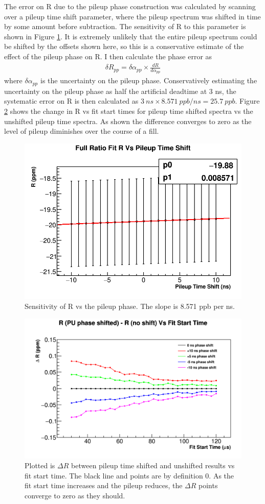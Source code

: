 		The error on R due to the pileup phase construction was calculated by scanning over a pileup time shift parameter, where the pileup spectrum was shifted in time by some amount before subtraction. The sensitivity of R to this parameter is shown in Figure \ref{fig:PileupPhase}. It is extremely unlikely that the entire pileup spectrum could be shifted by the offsets shown here, so this is a conservative estimate of the effect of the pileup phase on R. I then calculate the phase error as 
			\begin{align}
				\delta R_{pp} = \delta\alpha_{pp} \times \frac{dR}{d\alpha_{pp}}
			\end{align}
		where $\delta\alpha_{pp}$ is the uncertainty on the pileup phase. Conservatively estimating the uncertainty on the pileup phase as half the artificial deadtime at 3 ns, the systematic error on R is then calculated as $\SI{3}{ns} \times \SI{8.571}{ppb/ns} = \SI{25.7}{ppb}$. Figure \ref{fig:PileupTimeShiftFS} shows the change in R vs fit start times for pileup time shifted spectra vs the unshifted pileup time spectra. As shown the difference converges to zero as the level of pileup diminishes over the course of a fill.

		\begin{figure}[]
			\centering
			\includegraphics[width=.5\textwidth]{RatioCBO_R_Vs_PileupTimeShift_Canv}
		    \caption[PileupPhase]{Sensitivity of R vs the pileup phase. The slope is 8.571 ppb per ns.}
		    \label{fig:PileupPhase}
		\end{figure}

		\begin{figure}[]
			\centering
			\includegraphics[width=.8\textwidth]{pileupTimeShiftComparison}
		    \caption[PileupTimeShiftFS]{Plotted is $\Delta R$ between pileup time shifted and unshifted results vs fit start time. The black line and points are by definition 0. As the fit start time increases and the pileup reduces, the $\Delta R$ points converge to zero as they should.}
		    \label{fig:PileupTimeShiftFS}
		\end{figure}

